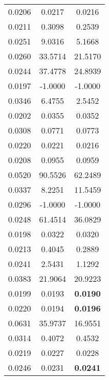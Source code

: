 \begin{longtable}{c|c c}
0.0206 & 0.0217 & 0.0216 \\

0.0211 & 0.3098 & 0.2539 \\

0.0251 & 9.0316 & 5.1668 \\

0.0260 & 33.5714 & 21.5170 \\

0.0244 & 37.4778 & 24.8939 \\

0.0197 & -1.0000 & -1.0000 \\

0.0346 & 6.4755 & 2.5452 \\

0.0202 & 0.0355 & 0.0352 \\

0.0308 & 0.0771 & 0.0773 \\
\hline
0.0220 & 0.0221 & 0.0216 \\

0.0208 & 0.0955 & 0.0959 \\

0.0520 & 90.5526 & 62.2489 \\

0.0337 & 8.2251 & 11.5459 \\

0.0296 & -1.0000 & -1.0000 \\

0.0248 & 61.4514 & 36.0829 \\

0.0198 & 0.0322 & 0.0320 \\

0.0213 & 0.4045 & 0.2889 \\

0.0241 & 2.5431 & 1.1292 \\

0.0383 & 21.9064 & 20.9223 \\
\hline
0.0199 & 0.0193 & \textbf{0.0190} \\

0.0220 & 0.0194 & \textbf{0.0196} \\

0.0631 & 35.9737 & 16.9551 \\

0.0314 & 0.4072 & 0.4532 \\

0.0219 & 0.0227 & 0.0228 \\

0.0246 & 0.0231 & \textbf{0.0241} \\


\end{longtable}
